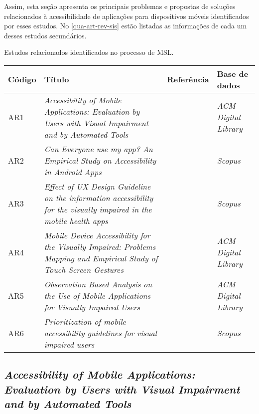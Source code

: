 Assim, esta seção apresenta os principais problemas e propostas de soluções relacionados à acessibilidade de aplicações para dispositivos móveis
identificados por esses estudos. No \autoref{qua-art-rev-sis} estão listadas as informações de cada um desses estudos secundários.

\begin{quadro}[htb!]
  \caption{\label{qua-art-rev-sis}Estudos relacionados identificados no processo de MSL.}
  \begin{tabular}{|m{1.2cm} | m{8.1cm} | m{2.7cm} | m{2.5cm}|}
    \hline
    \textbf{Código} & \textbf{Título}                                                                                                             & \textbf{Referência}  & \textbf{Base de dados}     \\
    \hline
    AR1             & \emph{Accessibility of Mobile Applications: Evaluation by Users with Visual Impairment and by Automated Tools}              & \cite{Mateus2020}    & \emph{ACM Digital Library} \\
    \hline
    AR2             & \emph{Can Everyone use my app? An Empirical Study on Accessibility in Android Apps}                                         & \cite{Vendome201941} & \emph{Scopus}              \\
    \hline
    AR3             & \emph{Effect of UX Design Guideline on the information accessibility for the visually impaired in the mobile health apps}   & \cite{Kim20191103}   & \emph{Scopus}              \\
    \hline
    AR4             & \emph{Mobile Device Accessibility for the Visually Impaired: Problems Mapping and Empirical Study of Touch Screen Gestures} & \cite{Damaceno2016}  & \emph{ACM Digital Library} \\
    \hline
    AR5             & \emph{Observation Based Analysis on the Use of Mobile Applications for Visually Impaired Users}                             & \cite{Siebra2016}    & \emph{ACM Digital Library} \\
    \hline
    AR6             & \emph{Prioritization of mobile accessibility guidelines for visual impaired users}                                          & \cite{Quispe2020}    & \emph{Scopus}              \\
    \hline
  \end{tabular}
\end{quadro}

\subsection{\emph{Accessibility of Mobile Applications: Evaluation by Users with Visual Impairment and by Automated Tools}}

